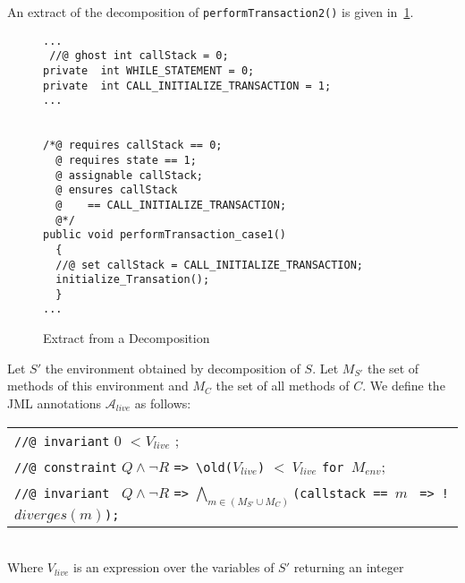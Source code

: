 An extract of the decomposition of \texttt{performTransaction2()}
is given in~\ref{fig-decomposition}.

\begin{figure}
{\scriptsize
\begin{multicols}{2}
\begin{verbatim}
...
 //@ ghost int callStack = 0;
private  int WHILE_STATEMENT = 0;
private  int CALL_INITIALIZE_TRANSACTION = 1;
...


/*@ requires callStack == 0; 
  @ requires state == 1;
  @ assignable callStack;
  @ ensures callStack 
  @    == CALL_INITIALIZE_TRANSACTION;
  @*/
public void performTransaction_case1()
  {         
  //@ set callStack = CALL_INITIALIZE_TRANSACTION;  
  initialize_Transation();  
  }
...
\end{verbatim}
\end{multicols}
}
\label{fig-decomposition}
\caption{Extract from a Decomposition}
\end{figure}

\begin{definition}
Let $S'$ the environment obtained by decomposition of $S$. Let  $M_{S'}$
the set of methods of this environment and  $M_{C}$ the set of all
methods of $C$. We define the JML annotations 
$\mathcal{A}_{live}$ as follows:\\
\begin{tabular}{l}
\verb+//@ invariant+ 0 $< V_{live}$ ;\\
\verb+//@ constraint+ $Q \wedge \neg R$ \verb+=> \old(+$V_{live}$\verb+)+ $<~V_{live}$ \verb+for +$M_{env}$;\\
\verb+//@ invariant + $Q \wedge \neg R$ \verb+=>+ $\bigwedge_{m \in (M_{S'} \cup M_{C})} $\verb+(callstack == +$m$ \verb+ => !+$diverges(m)$\verb+);+
\end{tabular}\\
Where $V_{live}$ is an expression over the variables 
of $S'$ returning an integer
\end{definition}
             
